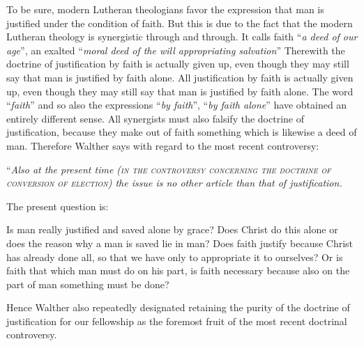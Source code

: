                 To be sure, modern Lutheran theologians favor the expression that man is justified under the condition of faith.  But this is due to the fact that the modern Lutheran theology is synergistic through and through.  It calls faith “\textit{a deed of our age}”, an exalted “\textit{moral deed of the will appropriating salvation}”  Therewith the doctrine of justification by faith is actually given up, even though they may still say that man is justified by faith alone.  All  justification by faith is actually given up, even though they may still say that man is justified by faith alone.  The word “\textit{faith}” and so also the expressions “\textit{by faith}”, “\textit{by faith alone}” have obtained an entirely different sense.  All synergists must also falsify the doctrine of justification, because they make out of faith something which is likewise a deed of man.  Therefore Walther says with regard to the most recent controversy: \begin{displayquote}“\textit{Also at the present time {\scriptsize\textsc{(in the controversy concerning the doctrine of conversion of election)}} the issue is no other article than that of justification.}\end{displayquote}  The present question is: \begin{displayquote}{\footnotesize Is man really justified and saved alone by grace?  Does Christ do this alone or does the reason why a man is saved lie in man?  Does faith justify because Christ has already done all, so that we have only to appropriate it to ourselves?  Or is faith that which man must do on his part, is faith necessary because also on the part of man something must be done?}\end{displayquote}  Hence Walther also repeatedly designated retaining the purity of the doctrine of justification for our fellowship as the foremost fruit of the most recent doctrinal controversy.